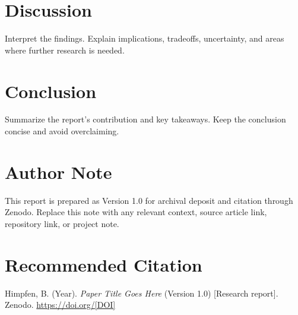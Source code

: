 \documentclass[11pt]{article}
\begin{document}
\section{Discussion}

Interpret the findings. Explain implications, tradeoffs, uncertainty, and areas where further research is needed.

\section{Conclusion}

Summarize the report's contribution and key takeaways. Keep the conclusion concise and avoid overclaiming.

\section*{Author Note}

This report is prepared as Version 1.0 for archival deposit and citation through Zenodo. Replace this note with any relevant context, source article link, repository link, or project note.

\section*{Recommended Citation}

Himpfen, B. (Year). \textit{Paper Title Goes Here} (Version 1.0) [Research report]. Zenodo. \url{https://doi.org/[DOI]}



\end{document}
